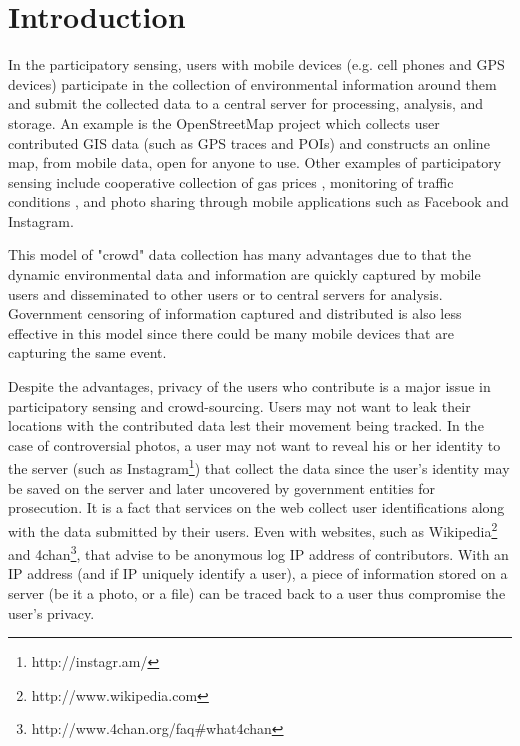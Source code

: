 \section{Introduction}\label{sec-intro}
In the participatory sensing, users with mobile devices
(e.g. cell phones and GPS devices) participate in the collection of environmental
information around them and submit the collected data to a central server
for processing, analysis, and storage\cite{DBLP:conf/mobisys/MunRSYBEHHWB09}.
An example is the OpenStreetMap\cite{DBLP:journals/pervasive/HaklayW08}
project which collects user contributed GIS
data (such as GPS traces and POIs) and constructs an online map, from mobile
data, open for anyone to use. 
Other examples of participatory sensing
include cooperative collection of gas prices \cite{DBLP:conf/dcoss/DongKCB08},
monitoring of traffic conditions \cite{DBLP:conf/dcoss/ConceicaoFB08}, and
photo sharing through mobile applications such as Facebook and Instagram.

This model of "crowd" data collection has many advantages due to that the
dynamic environmental data and information are quickly captured by mobile
users and disseminated to other users or to central servers for analysis.
Government censoring of information captured and distributed is also less
effective in this model since there could be many mobile devices that are
capturing the same event.

Despite the advantages, privacy of the users who contribute is a major
issue in participatory sensing and crowd-sourcing. Users may not want to
leak their locations with the contributed data lest their movement being
tracked. In the case of controversial photos, a user may not want to
reveal his or her identity to the server (such as
Instagram\footnote{http://instagr.am/}) that collect
the data since the user's identity may be saved on the server and later
uncovered by government entities for prosecution. It is a fact that
services on the web collect user identifications along with the data
submitted by their users\cite{wiki_privacy}. Even with websites, such as
Wikipedia\footnote{http://www.wikipedia.com} and
4chan\footnote{http://www.4chan.org/faq\#what4chan}, that advise to be
anonymous log IP address of contributors. With
an IP address (and if IP uniquely identify a user), a piece of
information stored on a server (be it a photo, or a file) can be traced
back to a user thus compromise the user's privacy.

